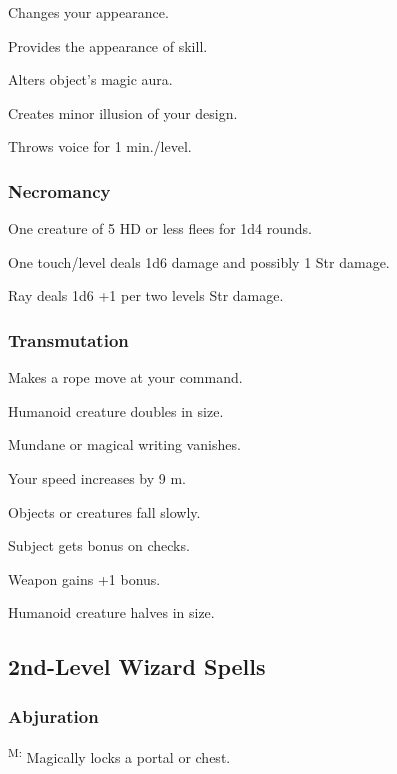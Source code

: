 	 Changes your appearance.

	 Provides the appearance of skill. %

	 Alters object's magic aura.

	 Creates minor illusion of your design.

	 Throws voice for 1 min./level.

\subsubsection{Necromancy}
	 One creature of 5 HD or less flees for 1d4 rounds.

	 One touch/level deals 1d6 damage and possibly 1 Str damage.

	 Ray deals 1d6 +1 per two levels Str damage.

\subsubsection{Transmutation}
	 Makes a rope move at your command.

	 Humanoid creature doubles in size.

	 Mundane or magical writing vanishes.

	 Your speed increases by 9 m.

	 Objects or creatures fall slowly.

	 Subject gets bonus on  checks.

	 Weapon gains +1 bonus.

	 Humanoid creature halves in size.



\subsection{2nd-Level Wizard Spells}

\subsubsection{Abjuration}
	\textsuperscript{M:} Magically locks a portal or chest.


